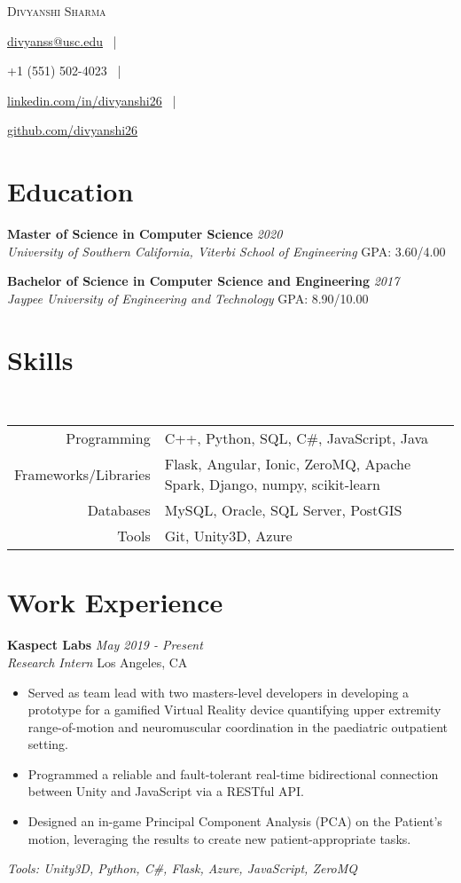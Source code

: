 \documentclass[letterpaper,10pt]{article}
\makeatletter
\newcommand{\organization}[4]{
    \vspace{1.5pt}
    \textbf{#1} \hfill{\emph{#2}} \\
    \emph{#3} \hfill{#4} \\
    \vspace{3pt}
}
\newcommand{\toolsused}[1]{
    \vspace{1.5pt}
    \emph{#1}\\
    \vspace{3pt}
}
\newcommand{\skills}[4]{
    \vspace{-2pt}
    \ \ \ \ \ \ \ \ \ \ \ 
    \begin{tabular}{r!{\color{burgundy}\vrule}l}
          Programming & #1 \\
          Frameworks/Libraries & #2 \\
          Databases & #3 \\
          Tools & #4
    \end{tabular}
    \vspace{4pt}
}
\newcommand{\bulletsBegin}{
    \vspace{1pt}
    \begin{minipage}{17.6cm}
    \begin{itemize}[leftmargin=0.6cm]
    \setlength\itemsep{-0.1em}
}
\newcommand{\bulletsEnd}{
    \end{itemize}\vspace{0pt}
    \end{minipage}
}
\newcommand{\myEmail}[1]{
    \href{mailto:divyanss@usc.edu}{#1}
    \ |
}
\newcommand{\myPhone}[1]{
    {#1}
    \ |
}
\newcommand{\mySite}[1]{
    \href{https://linkedin.com/in/divyanshi26}{#1}
    \ |
}
\newcommand{\myGitHub}[1]{
    \href{https://github.com/divyanshi26}{#1}
}
\newcommand{\myName}[5]{
    \begin{center}
        {\huge{\color{burgundy}\scshape{#1}}} \\
        \vspace{6pt}
        \myEmail{#2}
        \myPhone{#3}
        \mySite{#4}
        \myGitHub{#5}
    \end{center}
    \vspace{-4pt}
}
\makeatother
\begin{document}
    \myName{Divyanshi Sharma}{divyanss@usc.edu}{+1 (551) 502-4023}{linkedin.com/in/divyanshi26}{github.com/divyanshi26}

    \section{Education}
        
    \organization{Master of Science in Computer Science}{2020}
        {University of Southern California, Viterbi School of Engineering}{GPA: 3.60/4.00}

	\organization{Bachelor of Science in Computer Science and Engineering}{2017}
        {Jaypee University of Engineering and Technology}{GPA: 8.90/10.00}
        \vspace{5pt}
    
    
    \section{Skills}
    
    \skills
        {C++, Python, SQL, C\#, JavaScript, Java}  %
        {Flask, Angular, Ionic, ZeroMQ, Apache Spark, Django, numpy, scikit-learn}  %
        {MySQL, Oracle, SQL Server, PostGIS}  %
        {Git, Unity3D, Azure}  %


    \section{Work Experience}

        \organization{Kaspect Labs}{May 2019 - Present}
        {Research Intern}{Los Angeles, CA}
        \bulletsBegin
            \item Served as team lead with two masters-level developers in developing a prototype for a gamified Virtual Reality device quantifying upper extremity range-of-motion and neuromuscular coordination in the paediatric outpatient setting.
            \vspace{-1pt}
            \item Programmed a reliable and fault-tolerant real-time bidirectional connection between Unity and JavaScript via a RESTful API.
            \vspace{-2pt}
            \item Designed an in-game Principal Component Analysis (PCA) on the Patient’s motion, leveraging the results to create new patient-appropriate tasks.
        \bulletsEnd
        \vspace{-2pt}
        \toolsused{Tools: Unity3D, Python, C\#, Flask, Azure, JavaScript, ZeroMQ}
        \vspace{-5pt}
        
\end{document}
